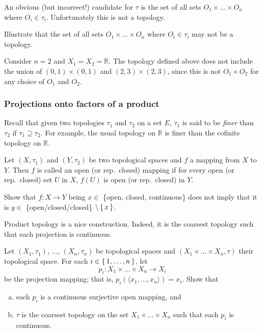 An obvious (but incorrect!) candidate for $\tau$
is the set of all sets $O_1 \times ... \times O_n$
where $O_i \in \tau_i$. Unfortunately this is not a topology.

\begin{qst}
  Illustrate that the set of all sets $O_1 \times ... \times O_n$ where $O_i \in \tau_i$ may not be a topology.
\end{qst}
\begin{asw}
  Consider $n=2$ and $X_1 = X_2 = \mathbb R$. The topology defined above does not include the union of
  $(0,1) \times (0,1)$ and $(2,3) \times (2,3)$,
  since this is not $O_1 \times O_2$ for any
  choice of $O_1$ and $O_2$.
\end{asw}

\subsubsection{Projections onto factors of a product}


Recall that given two topologies $\tau_1$ and $\tau_2$ on a set $E$,
$\tau_1$ is said to be \textit{finer} than
$\tau_2$ if $\tau_1 \supseteq  \tau_2$.
For example,
the usual topology on $\mathbb R$ is finer than the
cofinite topology on $\mathbb R$.

Let $(X, \tau_1)$ and $(Y, \tau_2)$ be two topological spaces
and $f$ a mapping from $X$ to $Y$.
Then $f$ is called an open (or rep.\ closed) mapping if for every open (or rep.\ closed) set 
$U$ in $X$, $f(U)$ is open (or rep.\ closed) in $Y$.

\begin{qst}
  Show that $f \colon X \to Y$ being $x \in $ \{open, closed, continuous\} does not imply that it is $y \in$ \{open/closed/closed\} $\setminus \set{x}$.
\end{qst}


Product topology is a nice construction.
Indeed, it is the coarsest topology such that each projection is continuous.


\begin{qst}
Let $(X_1, \tau_1)$, ..., $(X_n, \tau_n)$ be topological spaces and $(X_1 \times \dots \times X_n, \tau)$ their topological space.
For each $i \in \set{1,\dots,n}$, let
$$
p_i \colon X_1 \times \dots \times X_n \to X_i
$$
be the projection mapping; that is,
$p_i( \langle x_1, ..., x_n \rangle  ) = x_i$. Show that
\begin{enumerate}[(a)]
  \item each $p_i$ is a continuous surjective open mapping, and
  \item  $\tau$ is the coarsest topology on the set $X_1 \times \dots \times X_n$ such that each $p_i$ is continuous.
\end{enumerate}
\end{qst}

